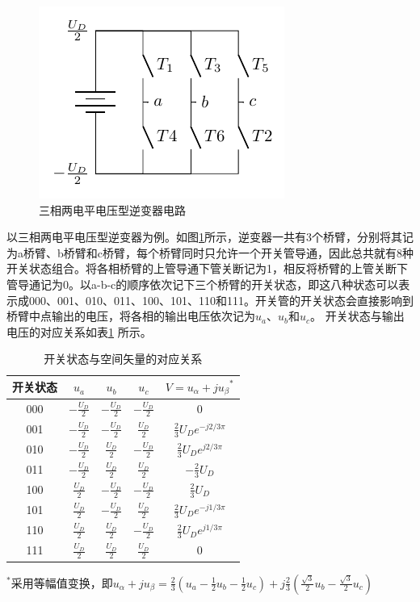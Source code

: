\documentclass{ctexart}
\numberwithin{equation}{section}
\begin{document}
\begin{figure}[hbtp]
  \centering
  \includegraphics[width = .5\linewidth ]{three-phase-converter.pdf}
  \caption{三相两电平电压型逆变器电路}
  \label{three-phase-converter}
\end{figure}  

以三相两电平电压型逆变器为例。如图\ref{three-phase-converter}所示，逆变器一共有3个桥臂，分别将其记为a桥臂、b桥臂和c桥臂，每个桥臂同时只允许一个开关管导通，因此总共就有8种开关状态组合。将各相桥臂的上管导通下管关断记为1，相反将桥臂的上管关断下管导通记为0。以a-b-c的顺序依次记下三个桥臂的开关状态，即这八种状态可以表示成000、001、010、011、100、101、110和111。开关管的开关状态会直接影响到桥臂中点输出的电压，将各相的输出电压依次记为$u_a$、$u_b$和$u_c$。
开关状态与输出电压的对应关系如表\ref{tab:switch-mode} 所示。

\begin{table}[hbtp]
  \centering
  \begin{tabular}{ccccc}
  \hline
  开关状态 & $u_a$            & $u_b$            & $u_c$            & ${V=u_\alpha + ju_\beta }^\ast $      \\ \hline
  000  & $-\frac{U_D}{2}$ & $-\frac{U_D}{2}$ & $-\frac{U_D}{2}$ & 0                            \\
  001  & $-\frac{U_D}{2}$ & $-\frac{U_D}{2}$ & $\frac{U_D}{2}$  & $\frac{2}{3}U_De^{-j2/3\pi}$ \\
  010  & $-\frac{U_D}{2}$ & $\frac{U_D}{2}$  & $-\frac{U_D}{2}$ & $\frac{2}{3}U_De^{j2/3\pi}$  \\
  011  & $-\frac{U_D}{2}$ & $\frac{U_D}{2}$  & $\frac{U_D}{2}$  & $-\frac{2}{3}U_D$            \\
  100  & $\frac{U_D}{2}$  & $-\frac{U_D}{2}$ & $-\frac{U_D}{2}$ & $\frac{2}{3}U_D$             \\
  101  & $\frac{U_D}{2}$  & $-\frac{U_D}{2}$ & $\frac{U_D}{2}$  & $\frac{2}{3}U_De^{-j1/3\pi}$ \\
  110  & $\frac{U_D}{2}$  & $\frac{U_D}{2}$  & $-\frac{U_D}{2}$ & $\frac{2}{3}U_De^{j1/3\pi}$  \\
  111  & $\frac{U_D}{2}$  & $\frac{U_D}{2}$  & $\frac{U_D}{2}$  & 0                           
  \end{tabular}

  \footnotesize{${^{\ast}}$采用等幅值变换，即$u_\alpha + ju_\beta = \frac{2}{3}{(u_a-\frac{1}{2}u_b-\frac{1}{2}u_c)}+j\frac{2}{3}(\frac{\sqrt{3}}{2}u_b-\frac{\sqrt{3}}{2}u_c)$ }
  \caption{开关状态与空间矢量的对应关系}
  \label{tab:switch-mode}
\end{table}
\end{document}

